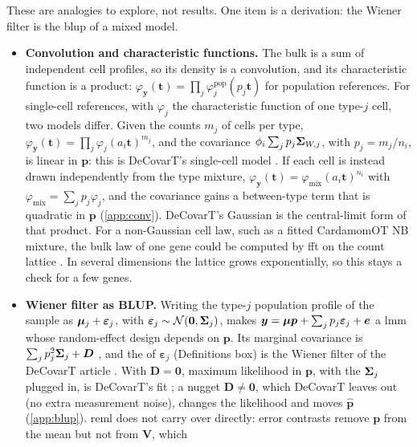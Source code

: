 \documentclass[11pt,a4paper]{article}
\begin{document}
\begin{specbox}
These are analogies to explore, not results. One item is a derivation: the Wiener filter is the
\gls{blup} of a mixed model.
\begin{itemize}
  \item \textbf{Convolution and characteristic functions.} The bulk is a sum of independent cell
        profiles, so its density is a convolution, and its characteristic function is a product:
        $\varphi_{\bm y}(\bm t)=\prod_j\varphi^{\mathrm{pop}}_j(p_j\bm t)$ for population references. For
        single-cell references, with $\varphi_j$ the characteristic function of one type-$j$ cell, two
        models differ. Given the counts $m_j$ of cells per type, $\varphi_{\bm y}(\bm t)=
        \prod_j\varphi_j(a_i\bm t)^{m_j}$, and the covariance $\phi_i\sum_jp_j\bm{\Sigma}_{W,j}$, with $p_j=m_j/n_i$, is
        linear in $\bm p$: this is DeCovarT's single-cell model . If each cell is instead drawn
        independently from the type mixture, $\varphi_{\bm y}(\bm t)=\varphi_{\mathrm{mix}}(a_i\bm t)^{n_i}$
        with $\varphi_{\mathrm{mix}}=\sum_jp_j\varphi_j$, and the covariance gains a between-type term
        that is quadratic in $\bm p$  (\cref{app:conv}). DeCovarT's Gaussian is the
        central-limit form of that product. For a non-Gaussian cell law, such as a fitted CardamomOT NB
        mixture, the bulk law of one gene could be computed by \gls{fft} on the count lattice
        \parencite{cooleyAlgorithmMachineCalculation1965}. In several dimensions the lattice grows
        exponentially, so this stays a check for a few genes.
  \item \textbf{Wiener filter as BLUP.} Writing the type-$j$ population profile of the sample as
        $\bm{\mu}_j+\bm\varepsilon_{j}$, with $\bm\varepsilon_j\sim\mathcal N(\bm 0,\bm{\Sigma}_j)$, makes
        $\bm y=\bm{\mu}\bm p+\sum_jp_j\bm\varepsilon_j+\bm e$ a \gls{lmm} whose random-effect design depends on
        $\bm p$. Its marginal covariance is $\sum_jp_j^2\bm{\Sigma}_j+\bm D$ , and the
         of $\bm\varepsilon_j$ (Definitions box) is the Wiener filter of the DeCovarT article . With
        $\bm D=\bm 0$, maximum likelihood in $\bm p$, with the $\bm{\Sigma}_j$ plugged in, is DeCovarT's fit
        ; a nugget $\bm D\neq\bm 0$, which DeCovarT leaves out (no extra measurement noise),
        changes the likelihood and moves $\hat{\bm p}$  (\cref{app:blup}). \Gls{reml} does not
        carry over directly: error contrasts remove $\bm p$ from the mean but not from $\bm V$, which

\end{itemize}
\end{specbox}
\end{document}
